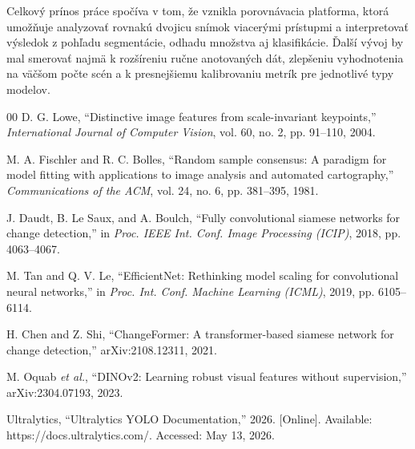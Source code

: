 \documentclass[conference]{IEEEtran}
\begin{document}
Celkový prínos práce spočíva v tom, že vznikla porovnávacia platforma, ktorá umožňuje analyzovať rovnakú dvojicu snímok viacerými prístupmi a interpretovať výsledok z pohľadu segmentácie, odhadu množstva aj klasifikácie. Ďalší vývoj by mal smerovať najmä k rozšíreniu ručne anotovaných dát, zlepšeniu vyhodnotenia na väčšom počte scén a k presnejšiemu kalibrovaniu metrík pre jednotlivé typy modelov.

\begin{thebibliography}{00}
D. G. Lowe, ``Distinctive image features from scale-invariant keypoints,'' \emph{International Journal of Computer Vision}, vol. 60, no. 2, pp. 91--110, 2004.

M. A. Fischler and R. C. Bolles, ``Random sample consensus: A paradigm for model fitting with applications to image analysis and automated cartography,'' \emph{Communications of the ACM}, vol. 24, no. 6, pp. 381--395, 1981.

J. Daudt, B. Le Saux, and A. Boulch, ``Fully convolutional siamese networks for change detection,'' in \emph{Proc. IEEE Int. Conf. Image Processing (ICIP)}, 2018, pp. 4063--4067.

M. Tan and Q. V. Le, ``EfficientNet: Rethinking model scaling for convolutional neural networks,'' in \emph{Proc. Int. Conf. Machine Learning (ICML)}, 2019, pp. 6105--6114.

H. Chen and Z. Shi, ``ChangeFormer: A transformer-based siamese network for change detection,'' arXiv:2108.12311, 2021.

M. Oquab \emph{et al.}, ``DINOv2: Learning robust visual features without supervision,'' arXiv:2304.07193, 2023.

Ultralytics, ``Ultralytics YOLO Documentation,'' 2026. [Online]. Available: https://docs.ultralytics.com/. Accessed: May 13, 2026.
\end{thebibliography}
\end{document}
